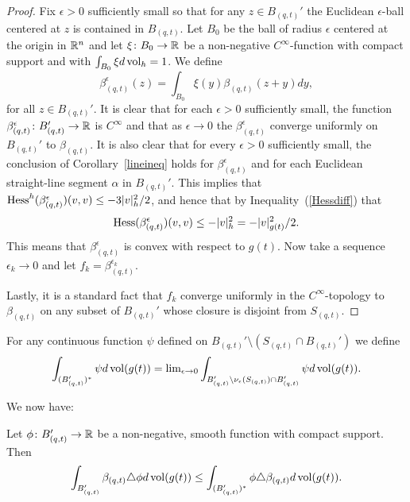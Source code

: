 \begin{proof}\sketch
{}
Fix $\epsilon>0$ sufficiently small so that for any $z\in
B_{(q,t)}'$ the Euclidean $\epsilon$-ball centered at $z$ is
contained in $B_{(q,t)}$. Let $B_0$ be the ball of radius $\epsilon$
centered at the origin in $\mathbb{R}^n$ and let $\xi\colon B_0\to \mathbb{R}$ be
a non-negative $C^\infty$-function with compact support and with
$\int_{B_0}\xi d\operatorname{vol}_h=1$. We define
$$\beta_{(q,t)}^\epsilon(z)=\int_{B_0}\xi(y)\beta_{(q,t)}(z+y)dy,$$
for all $z\in B_{(q,t)}'$. It is clear that for each $\epsilon>0$
sufficiently small, the function $\beta_{(q,t)}^\epsilon\colon
B_{(q,t)}'\to \mathbb{R}$ is $C^\infty$ and that as $\epsilon\rightarrow 0$
the $\beta_{(q,t)}^\epsilon$ converge uniformly on $B_{(q,t)}'$ to
$\beta_{(q,t)}$. It is also clear that for every $\epsilon>0$
sufficiently small, the conclusion of Corollary~\ref{lineineq} holds
for $\beta_{(q,t)}^\epsilon$ and for each Euclidean straight-line
segment $\alpha$ in $B_{(q,t)}'$. This implies that $\operatorname{Hess}^h(\beta_{(q,t)}^\epsilon)(v,v)\le -3|v|_h^2/2$, and hence that
by Inequality~(\ref{Hessdiff}) that
$$\operatorname{Hess}(\beta_{(q,t)}^\epsilon)(v,v)\le -|v|^2_h=-|v|^2_{g(t)}/2.$$
This means that $\beta_{(q,t)}^\epsilon$ is convex with respect to
$g(t)$. Now take a sequence $\epsilon_k\rightarrow 0$ and let
$f_k=\beta_{(q,t)}^{\epsilon_k}$.

Lastly, it is a standard fact that $f_k$ converge uniformly in the
$C^\infty$-topology to $\beta_{(q,t)}$ on any subset of $B_{(q,t)}'$
whose closure is disjoint from $S_{(q,t)}$.
\end{proof}

\begin{definition}
\label{def:starred-integral}
For any continuous function $\psi$ defined on $B_{(q,t)}'\setminus
\left(S_{(q,t)}\cap B_{(q,t)}'\right)$ we define
$$\int_{(B_{(q,t)}')^*}\psi d\operatorname{vol}(g(t))=\mathrm{lim}_{\epsilon\rightarrow
0}\int_{B_{(q,t)}'\setminus \nu_\epsilon(S_{(q,t)})\cap
B_{(q,t)}'}\psi d\operatorname{vol}(g(t)).$$
\end{definition}

We now have:

\begin{claim}
\label{claim:beta-weak-laplacian-inequality}
\label{wineq}
Let $\phi\colon B_{(q,t)}'\to \mathbb{R}$ be a non-negative, smooth
function with compact support. Then
$$\int_{B_{(q,t)}'}\beta_{(q,t)}\triangle \phi d\operatorname{vol}(g(t))\le \int_{(B_{(q,t)}')^*}\phi
\triangle \beta_{(q,t)} d\operatorname{vol}(g(t)).$$
\end{claim}


